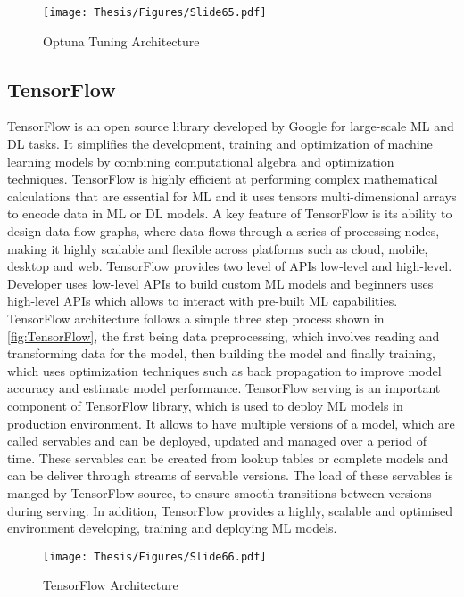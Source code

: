 \begin{figure}[h]
\centering
\texttt{[image: Thesis/Figures/Slide65.pdf]}
\caption{\label{fig:optuna}Optuna Tuning Architecture \cite{optuna_hpo}}
\end{figure}

\subsection{TensorFlow}

TensorFlow is an open source library developed by Google for large-scale ML and DL tasks. It simplifies the development, training and optimization of machine learning models by combining computational algebra and optimization techniques. TensorFlow is highly efficient at performing complex mathematical calculations that are essential for ML and it uses tensors multi-dimensional arrays to encode data in ML or DL models. A key feature of TensorFlow is its ability to design data flow graphs, where data flows through a series of processing nodes, making it highly scalable and flexible across platforms such as cloud, mobile, desktop and web. TensorFlow provides two level of APIs low-level and high-level. Developer uses low-level APIs to build custom ML models and beginners uses high-level APIs which allows to interact with pre-built ML capabilities. TensorFlow architecture follows a simple three step process shown in \autoref{fig:TensorFlow}, the first being data preprocessing, which involves reading and transforming data for the model, then building the model and finally training, which uses optimization techniques such as back propagation to improve model accuracy and estimate model performance. TensorFlow serving is an important component of TensorFlow library, which is used to deploy ML models in production environment. It allows to have multiple versions of a model, which are called servables and can be deployed, updated and managed over a period of time. These servables can be created from lookup tables or complete models and can be deliver through streams of servable versions. The load of these servables is manged by TensorFlow source, to ensure smooth transitions between versions during serving. In addition, TensorFlow provides a highly, scalable and optimised environment developing, training and deploying ML models. \cite{ramchandani2022survey}

\begin{figure}[h]
\centering
\texttt{[image: Thesis/Figures/Slide66.pdf]}
\caption{\label{fig:TensorFlow}TensorFlow Architecture \cite{ramchandani2022survey}}
\end{figure}

